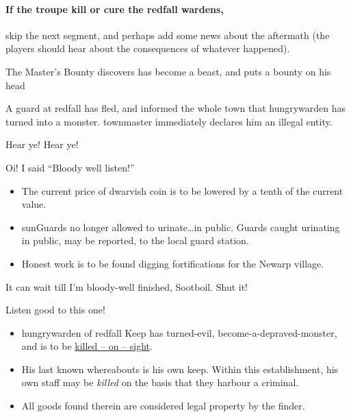 \paragraph{If the troupe kill or cure the \gls{redfall} \glspl{warden},}
skip the next \gls{segment}, and perhaps add some news about the aftermath (the players should hear about the consequences of whatever happened).

{The Master's Bounty}%
{ discovers  has become a beast, and puts a bounty on his head}%
\label{mastersBounty}

A guard at \gls{redfall} has fled, and informed the whole town that \gls{hungrywarden} has turned into a monster.
\Gls{townmaster} immediately declares him an illegal entity.

\begin{speechtext}
    Hear ye! Hear ye!

    Oi! I said ``Bloody well listen!''

    \begin{itemize}
      \item
      The current price of dwarvish coin is to be lowered by a tenth of the current value.
      \item
      \Glspl{sunGuard} no longer allowed to urinate\ldots in public.
      Guards caught urinating in public, may be reported, to the local {\footnotesize guard station}.
      \item
      Honest work is to be found digging fortifications for the Newarp \gls{village}.
    \end{itemize}

    It can wait till I'm bloody-well finished, Sootboil.
    Shut it!

    Listen good to this one!
    \begin{itemize}
      \item
      \Gls{hungrywarden} of \gls{redfall} Keep has turned-evil, become-a-depraved-monster, and is to be \underline{\large killed -- on -- sight}.
      \item
      His last known whereabouts is his own keep.
      Within this establishment, his own staff may be \emph{killed} on the basis that they harbour a criminal.
      \item
      All goods found therein are considered legal property by the finder.
    \end{itemize}
\end{speechtext}

